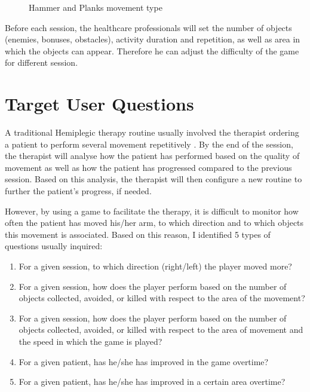 
\begin{figure}%
    \centering
    \qquad
    \caption{Hammer and Planks movement type}%
    \label{fig:example}%
\end{figure}


Before each session, the healthcare professionals will set the number of objects (enemies, bonuses, obstacles), activity duration and repetition, as well as area in which the objects can appear. Therefore he can adjust the difficulty of the game for different session.


\section{Target User Questions}

A traditional Hemiplegic therapy routine usually involved the therapist ordering a patient to perform several movement repetitively \cite{rahman}. By the end of the session, the therapist will analyse how the patient has performed based on the quality of movement as well as how the patient has progressed compared to the previous session. Based on this analysis, the therapist will then configure a new routine to further the patient's progress, if needed.

However, by using a game to facilitate the therapy, it is difficult to monitor how often the patient has moved his/her arm, to which direction and to which objects this movement is associated. Based on this reason, I identified 5 types of questions usually inquired:

\newcommand{\subscript}[2]{$#1 _ #2$}	
\begin{enumerate}[label=(\subscript{Q}{\arabic*})]
\item For a given session, to which direction (right/left) the player moved more? \label{q1}
\item For a given session, how does the player perform based on the number of objects collected, avoided, or killed with respect to the area of the movement?\label{q2}
\item For a given session, how does the player perform based on the number of objects collected, avoided, or killed with respect to the area of movement and the speed in which the game is played?\label{q3}
\item For a given patient, has he/she has improved in the game overtime?\label{q4}
\item For a given patient, has he/she has improved in a certain area overtime?\label{q5}
\end{enumerate}

